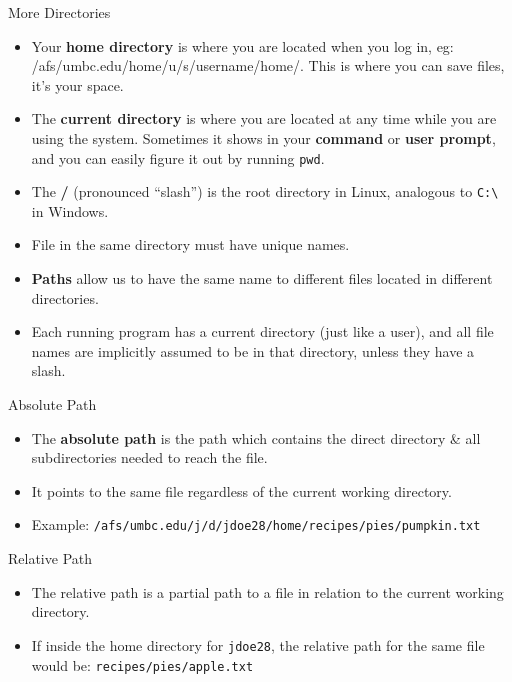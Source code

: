 \documentclass[graphics]{beamer}
\begin{document}
\begin{frame}{More Directories}
    \begin{itemize}
        \item Your \textbf{home directory} is where you are located when you log in, eg: /afs/umbc.edu/home/u/s/username/home/. This is where you can save files, it's your space.
        \item The \textbf{current directory} is where you are located at any time while you are using the system. Sometimes it shows in your \textbf{command} or \textbf{user prompt}, and you can easily figure it out by running \texttt{pwd}.
        \item The \textbf{/} (pronounced ``slash'') is the root directory in Linux, analogous to \texttt{C:\textbackslash} in Windows.
        \item File in the same directory must have unique names.
        \item \textbf{Paths} allow us to have the same name to different files located in different directories.
        \item Each running program has a current directory (just like a user), and all file names are implicitly assumed to be in that directory, unless they have a slash.
    \end{itemize}
\end{frame}

\begin{frame}{Absolute Path}
    \begin{itemize}
        \item The \textbf{absolute path} is the path which contains the direct directory \& all subdirectories needed to reach the file.
        \item It points to the same file regardless of the current working directory.
        \item Example: \texttt{/afs/umbc.edu/j/d/jdoe28/home/recipes/pies/pumpkin.txt}
    \end{itemize}
\end{frame}

\begin{frame}{Relative Path}
    \begin{itemize}
        \item The relative path is a partial path to a file in relation to the current working directory.
        \item If inside the home directory for \texttt{jdoe28}, the relative path for the same file would be: \texttt{recipes/pies/apple.txt}
    \end{itemize}
\end{frame}
\end{document}
